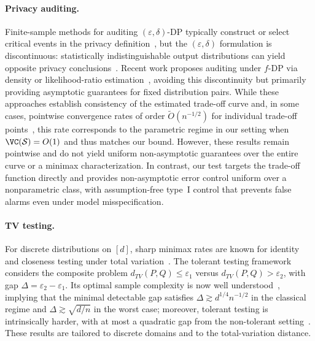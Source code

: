 \documentclass[english]{article}
\theoremstyle{plain}
\theoremstyle{definition}
\begin{document}
\paragraph{Privacy auditing.}
Finite-sample methods for auditing $(\varepsilon,\delta)$-DP typically
construct or select critical events in the privacy
definition~\cite{Auditing1,Auditing2,Auditing3,DP-Definition}, but the
$(\varepsilon,\delta)$ formulation is discontinuous: statistically
indistinguishable output distributions can yield opposite privacy
conclusions~\cite{Auditing-Impossibility}.  Recent work proposes auditing under
$f$-DP via density or likelihood-ratio
estimation~\cite{empirical-auditing-f-dp-1, empirical-auditing-f-dp-2,
DPAuditing}, avoiding this discontinuity but primarily providing asymptotic
guarantees for fixed distribution pairs. While these approaches establish
consistency of the estimated trade-off curve and, in some cases, pointwise
convergence rates of order $\widetilde{O}(n^{-1/2})$ for individual trade-off points~\cite{DPAuditing}, this rate
corresponds to the parametric regime in our setting when $\VC(\mathcal S)=O(1)$
and thus matches our bound. However, these results remain pointwise and do not
yield uniform non-asymptotic guarantees over the entire curve or a minimax
characterization. In contrast, our test targets the trade-off function directly
and provides non-asymptotic error control uniform over a nonparametric class,
with assumption-free type~I control that prevents false alarms even under model
misspecification.


\paragraph{TV testing.}
For discrete distributions on $[d]$, sharp minimax rates are known for identity and closeness testing under total variation~\cite{TV2008,TV2000,chan2014optimal,diakonikolas2019collision}. The tolerant testing framework~\cite{tolerant2001,tolerant2006,tolerant2025} considers the composite problem $d_{TV}(P,Q)\leqslant \varepsilon_1$ versus $d_{TV}(P,Q)> \varepsilon_2$, with gap $\Delta=\varepsilon_2-\varepsilon_1$. Its optimal sample complexity is now well understood~\cite{price2021tolerant}, implying that the minimal detectable gap satisfies $\Delta \gtrsim d^{1/4}n^{-1/2}$ in the classical regime and $\Delta \gtrsim \sqrt{d/n}$ in the worst case;  moreover, tolerant testing is intrinsically harder, with at most a quadratic gap from the non-tolerant setting~\cite{chakraborty2022gap}. These results are tailored to discrete domains and to the total-variation distance.
\end{document}
